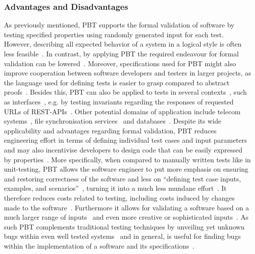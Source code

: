 \documentclass[runningheads]{llncs}
\begin{document}
\subsubsection{Advantages and Disadvantages} \label{sec:adv_disadv}
As previously mentioned, PBT supports the formal validation of software by testing specified properties using randomly generated input for each test. However, describing all expected behavior of a system in a logical style is often less feasible~\cite{Chen2022,Koopman2012}. In contrast, by applying PBT the required endeavour for formal validation can be lowered~\cite{Hritcu2016,Chen2022,Paraskevopoulou2015}. Moreover, specifications used for PBT might also improve cooperation between software developers and testers in larger projects, as the language used for defining tests is easier to grasp compared to abstract proofs~\cite{Chen2022,Loescher2017}. Besides this, PBT can also be applied to tests in several contexts~\cite{Karlsson2019}, such as interfaces~\cite{Karlsson2019,Francisco2013,LamelaSeijas2013}, e.g. by testing invariants regarding the responses of requested URLs of REST-APIs~\cite{Karlsson2019}. Other potential domains of application include telecom systems~\cite{Arts2006}, file synchronisation services~\cite{Hughes2016} and databases~\cite{Arts2015}. Despite its wide applicability and advantages regarding formal validation, PBT reduces engineering effort in terms of defining individual test cases and input parameters~\cite{Chen2022,Loescher2017,Corgozinho2023} and may also incentivise developers to design code that can be easily expressed by properties~\cite{Chen2022}. More specifically, when compared to manually written tests like in unit-testing, PBT allows the software engineer to put more emphasis on ensuring and restoring correctness of the software and less on ``defining test case inputs, examples, and scenarios''~\cite{Corgozinho2023}, turning it into a much less mundane effort~\cite{Loescher2017}. It therefore reduces costs related to testing, including costs induced by changes made to the software~\cite{Chen2022,Loescher2017}. Furthermore it allows for validating a software based on a much larger range of inputs~\cite{Loescher2017,Corgozinho2023} and even more creative or sophisticated inputs~\cite{Arts2015}. As such PBT complements traditional testing techniques by unveiling yet unknown bugs within even well tested systems~\cite{Arts2015,Hughes2016,Arts2006} and in general, is useful for finding bugs within the implementation of a software and its specifications~\cite{Chen2022,Fink1997,Loescher2017,Paraskevopoulou2015,Claessen2000,Corgozinho2023}.
\end{document}
